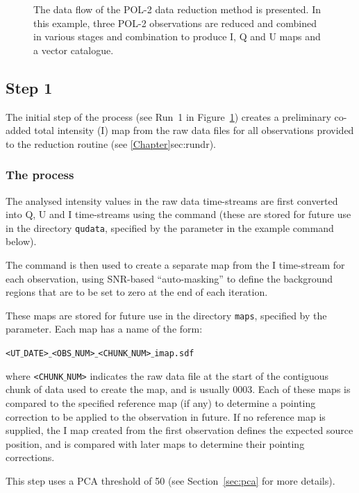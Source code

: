 \begin{figure}[t!]
\begin{center}
\caption [POL-2 Data Flow]{ The data flow of the POL-2 data reduction
  method is presented. In this example, three POL-2 observations are
  reduced and combined in various stages and combination to produce I,
  Q and U maps and a vector catalogue.  }
\label{fig:pol2drflow}
\end{center}
\end{figure}


\subsection*{Step 1}

The initial step of the process (see Run~1 in Figure~\ref{fig:pol2drflow})
creates a preliminary co-added total intensity
(I) map from the raw data files for all observations provided to the
reduction routine (see \cref{Chapter}{sec:rundr}{}).


\subsubsection*{The process}
The analysed intensity values in the raw data time-streams are first
converted into Q, U and I time-streams using the
 command (these are stored
for future use in the directory \texttt{qudata}, specified by the
 parameter in the example command below).

The  command is then used to
create a separate map from the I time-stream for each observation,
using SNR-based ``auto-masking'' to define the background regions that
are to be set to zero at the end of each iteration.

These maps are stored for future use in the directory \texttt{maps},
specified by the  parameter. Each map has a name of the form:

\texttt{<UT$\_$DATE>$\_$<OBS$\_$NUM>$\_$<CHUNK$\_$NUM>$\_$imap.sdf}

where \texttt{<CHUNK$\_$NUM>} indicates the raw data file at the start
of the contiguous chunk of data used to create the map, and is usually
0003.  Each of these maps is compared to the specified reference map
(if any) to determine a pointing correction to be applied to the
observation in future. If no reference map is supplied, the I map
created from the first observation defines the expected source
position, and is compared with later maps to determine their pointing
corrections.

This step uses a PCA threshold of 50 (see Section~\ref{sec:pca} for more details).

